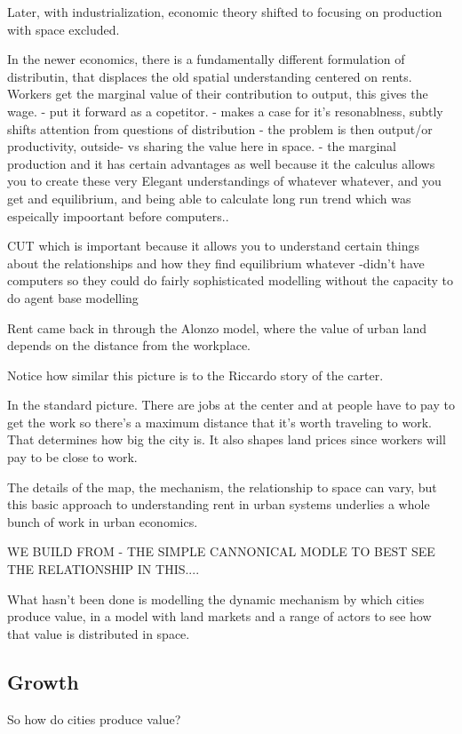 \documentclass[]{article}
\begin{document}
Later, with industrialization, economic theory shifted to focusing on production with space excluded.

In the newer economics, there is a fundamentally different formulation of distributin, that displaces the old spatial understanding centered on rents. 
Workers get the marginal value of their contribution to output, this gives the wage. 
- put it forward as a copetitor.
- makes a case for it's resonablness, subtly shifts attention from questions of distribution - the problem is then output/or productivity, outside- vs sharing the value here in space. 
- the marginal production and it has certain advantages as well because it the calculus allows you to create these very Elegant understandings of whatever whatever, and you get and equilibrium, and being able to calculate long run trend  which was espeically impoortant before computers.. 

CUT which is important because it allows you to understand certain things about the relationships and how they find equilibrium whatever
-didn’t have computers so they could do fairly sophisticated modelling without the capacity to do agent base modelling 

Rent came back in through the Alonzo model, where the value of urban land depends on the distance from the workplace. 

Notice how similar this picture is to the Riccardo story of the carter.

In  the standard picture. There are jobs at the center and at people have to pay to get the work so  there's a maximum distance that it's worth traveling to work. That determines how big the city is. It also shapes land prices since workers will pay to be close to work.

The details of the map, the mechanism, the relationship to space can vary, but this basic approach to understanding rent in urban systems underlies a whole bunch of work in urban economics.

WE BUILD FROM - THE SIMPLE CANNONICAL MODLE TO BEST SEE THE RELATIONSHIP IN THIS....

What hasn't been done is modelling the dynamic mechanism by which cities produce value, in a model with land markets and a range of actors to see how that value is distributed in space. 



\subsection{Growth}
So how do cities produce value?
\end{document}

